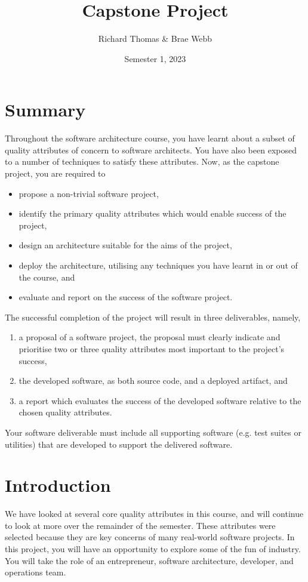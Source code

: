 \documentclass{csse4400}
\title{Capstone Project}
\author{Richard Thomas \& Brae Webb}
\date{Semester 1, 2023}
\begin{document}

\maketitle

\section*{Summary}
Throughout the software architecture course,
you have learnt about a subset of quality attributes of concern to software architects.
You have also been exposed to a number of techniques to satisfy these attributes.
Now, as the capstone project, you are required to
\begin{itemize}
    \item propose a non-trivial software project,
    \item identify the primary quality attributes which would enable success of the project,
    \item design an architecture suitable for the aims of the project,
    \item deploy the architecture, utilising any techniques you have learnt in or out of the course, and
    \item evaluate and report on the success of the software project.
\end{itemize}

\noindent
The successful completion of the project will result in three deliverables, namely,
\begin{enumerate}[label=\roman*]
    \item a proposal of a software project, the proposal must clearly indicate and prioritise two or three quality attributes most important to the project's success,
    \item the developed software, as both source code, and a deployed artifact, and
    \item a report which evaluates the success of the developed software relative to the chosen quality attributes.
\end{enumerate}

\noindent
Your software deliverable must include all supporting software (e.g. test suites or utilities) that are developed to support the delivered software.

\section{Introduction}
We have looked at several core quality attributes in this course, and will continue to look at more over the remainder of the semester.
These attributes were selected because they are key concerns of many real-world software projects.
In this project, you will have an opportunity to explore some of the fun of industry.
You will take the role of an entrepreneur, software architecture, developer, and operations team.
\end{document}
